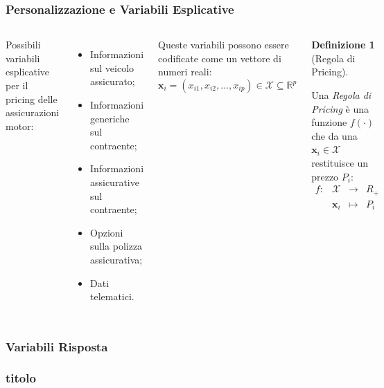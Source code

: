 \documentclass[pdf, aspectratio=169]{beamer}\usepackage[]{graphicx}\usepackage[]{color}
\theoremstyle{definition}
\newtheorem{definizione}{Definizione}[section]
\begin{document}
\begin{frame}
\frametitle{Personalizzazione e Variabili Esplicative}

\fontsize{9pt}{11pt}\selectfont

\begin{columns}

Possibili variabili esplicative per il pricing delle assicurazioni motor:
\begin{itemize}
\item Informazioni sul veicolo assicurato;
\item Informazioni generiche sul contraente;
\item Informazioni assicurative sul contraente;
\item Opzioni sulla polizza assicurativa;
\item Dati telematici.
\end{itemize}

\vspace{0.5cm}

Queste variabili possono essere codificate come un vettore di numeri reali:
$$\boldsymbol{x}_i=(x_{i1}, x_{i2}, \dots, x_{ip})\in\mathcal{X}\subseteq\mathbb{R}^p$$


\begin{definizione}[{\normalsize Regola di Pricing}]
  \label{def:pricing-rule}

  Una \textit{Regola di Pricing} è una funzione $f(\cdot)$ che da una $\boldsymbol{x}_i\in\mathcal{X}$ restituisce un prezzo $P_i$:
  $$  
  \begin{array}{rccl}
  f: & \mathcal{X}      & \longrightarrow  & R_+ \\
     & \boldsymbol{x}_i & \longmapsto      & P_i \\
  \end{array}
  $$
\end{definizione}

\end{columns}


\end{frame}


\begin{frame}
\frametitle{Variabili Risposta}

\end{frame}


\begin{frame}
\frametitle{titolo}

\end{frame}
\end{document}
